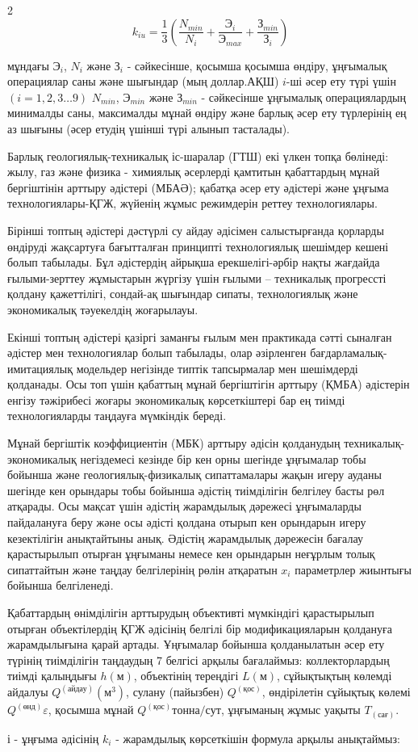 \begin{multicols}{2}
\begin{equation}
k_{iu}=\frac{1}{3}\left(\frac{N_{min}}{N_i}+\frac{Э_i}{Э_{max}}+\frac{З_{min}}{З_i}\right)
\end{equation}

мұндағы \(Э_i\), \(N_i\) және \(З_i\) - сәйкесінше, қосымша қосымша
өндіру, ұңғымалық операциялар саны және шығындар (мың
доллар.АҚШ) \(i\)-ші әсер ету түрі үшін
\((i=1,2,3\ldots9)\) \(N_{min}\), \(Э_{min}\) және \(З_{min}\) -
сәйкесінше ұңғымалық операциялардың минималды саны, максималды мұнай
өндіру және барлық әсер ету түрлерінің ең аз шығыны (әсер етудің
үшінші түрі алынып тасталады).

Барлық геологиялық-техникалық іс-шаралар (ГТШ) екі үлкен топқа бөлінеді:
жылу, газ және физика - химиялық әсерлерді қамтитын қабаттардың мұнай
бергіштінін арттыру әдістері (МБАӘ); қабатқа әсер ету әдістері және
ұңғыма технологиялары-ҚГЖ, жүйенің жұмыс режимдерін реттеу
технологиялары.

Бірінші топтың әдістері дәстүрлі су айдау әдісімен салыстырғанда
қорларды өндіруді жақсартуға бағытталған принципті технологиялық
шешімдер кешені болып табылады. Бұл әдістердің айрықша ерекшелігі-әрбір
нақты жағдайда ғылыми-зерттеу жұмыстарын жүргізу үшін ғылыми --
техникалық прогрессті қолдану қажеттілігі, сондай-ақ шығындар сипаты,
технологиялық және экономикалық тәуекелдің жоғарылауы.

Екінші топтың әдістері қазіргі заманғы ғылым мен практикада сәтті
сыналған әдістер мен технологиялар болып табылады, олар әзірленген
бағдарламалық-имитациялық модельдер негізінде типтік тапсырмалар мен
шешімдерді қолданады. Осы топ үшін қабаттың мұнай бергіштігін арттыру
(ҚМБА) әдістерін енгізу тәжірибесі жоғары экономикалық көрсеткіштері бар
ең тиімді технологияларды таңдауға мүмкіндік береді.

Мұнай бергіштік коэффициентін (МБК) арттыру әдісін қолданудың
техникалық-экономикалық негіздемесі кезінде бір кен орны шегінде
ұңғымалар тобы бойынша және геологиялық-физикалық сипаттамалары жақын
игеру ауданы шегінде кен орындары тобы бойынша әдістің тиімділігін
белгілеу басты рөл атқарады. Осы мақсат үшін әдістің жарамдылық
дәрежесі ұңғымаларды пайдалануға беру және осы әдісті қолдана отырып
кен орындарын игеру кезектілігін анықтайтыны анық. Әдістің жарамдылық
дәрежесін бағалау қарастырылып отырған ұңғыманы немесе кен орындарын
неғұрлым толық сипаттайтын және таңдау белгілерінің рөлін
атқаратын \(x_i\) параметрлер жиынтығы бойынша белгіленеді.

Қабаттардың өнімділігін арттырудың объективті мүмкіндігі қарастырылып
отырған объектілердің ҚГЖ әдісінің белгілі бір модификацияларын
қолдануға жарамдылығына қарай артады. Ұңғымалар бойынша қолданылатын
әсер ету түрінің тиімділігін таңдаудың 7 белгісі арқылы бағалаймыз:
коллекторлардың тиімді қалыңдығы \(h(м)\), объектінің тереңдігі \(L(м)\),
сұйықтықтың көлемді айдалуы \(Q^{(айдау)}(м^3)\),
сулану (пайызбен) \(Q^{(қос)}\), өндірілетін сұйықтық көлемі
\(Q^{(өнд)}\varepsilon\), қосымша мұнай \(Q^{(қос)}тонна/сут\),
ұңғыманың жұмыс уақыты \(T_{(сағ)}\).

\(і\) - ұңғыма әдісінің \(k_i\) - жарамдылық көрсеткішін формула арқылы анықтаймыз:
\end{multicols}
